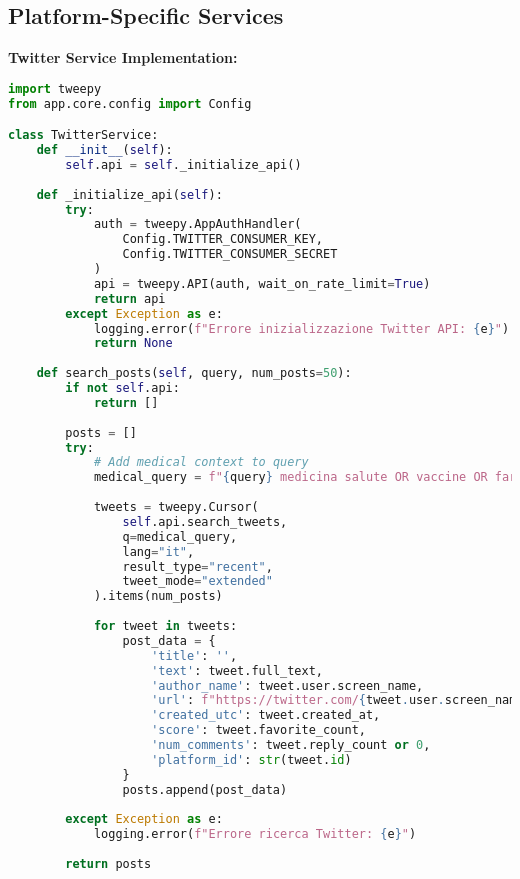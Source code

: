 \documentclass[12pt,a4paper]{report}
\begin{document}
\subsection{Platform-Specific Services}

\textbf{Twitter Service Implementation:}

\begin{lstlisting}[language=Python, caption=Twitter Service]
import tweepy
from app.core.config import Config

class TwitterService:
    def __init__(self):
        self.api = self._initialize_api()
    
    def _initialize_api(self):
        try:
            auth = tweepy.AppAuthHandler(
                Config.TWITTER_CONSUMER_KEY,
                Config.TWITTER_CONSUMER_SECRET
            )
            api = tweepy.API(auth, wait_on_rate_limit=True)
            return api
        except Exception as e:
            logging.error(f"Errore inizializzazione Twitter API: {e}")
            return None
    
    def search_posts(self, query, num_posts=50):
        if not self.api:
            return []
        
        posts = []
        try:
            # Add medical context to query
            medical_query = f"{query} medicina salute OR vaccine OR farmaco"
            
            tweets = tweepy.Cursor(
                self.api.search_tweets,
                q=medical_query,
                lang="it",
                result_type="recent",
                tweet_mode="extended"
            ).items(num_posts)
            
            for tweet in tweets:
                post_data = {
                    'title': '',
                    'text': tweet.full_text,
                    'author_name': tweet.user.screen_name,
                    'url': f"https://twitter.com/{tweet.user.screen_name}/status/{tweet.id}",
                    'created_utc': tweet.created_at,
                    'score': tweet.favorite_count,
                    'num_comments': tweet.reply_count or 0,
                    'platform_id': str(tweet.id)
                }
                posts.append(post_data)
            
        except Exception as e:
            logging.error(f"Errore ricerca Twitter: {e}")
        
        return posts
\end{lstlisting}
\end{document}
